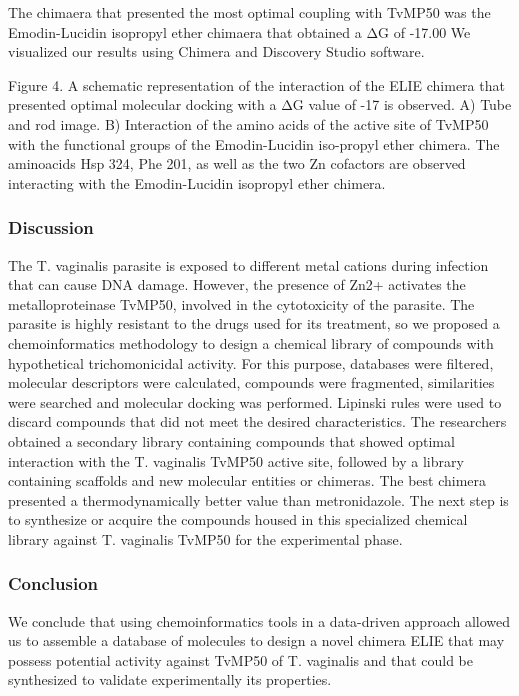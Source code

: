 \documentclass[
]{article}
\begin{document}
The chimaera that presented the most optimal coupling with TvMP50 was
the Emodin-Lucidin isopropyl ether chimaera that obtained a ΔG of -17.00
We visualized our results using Chimera and Discovery Studio software.

Figure 4. A schematic representation of the interaction of the ELIE
chimera that presented optimal molecular docking with a ΔG value of -17
is observed. A) Tube and rod image. B) Interaction of the amino acids of
the active site of TvMP50 with the functional groups of the
Emodin-Lucidin iso-propyl ether chimera. The aminoacids Hsp 324, Phe
201, as well as the two Zn cofactors are observed interacting with the
Emodin-Lucidin isopropyl ether chimera.

\hypertarget{discussion}{%
\subsubsection{Discussion}\label{discussion}}

The T. vaginalis parasite is exposed to different metal cations during
infection that can cause DNA damage. However, the presence of Zn2+
activates the metalloproteinase TvMP50, involved in the cytotoxicity of
the parasite. The parasite is highly resistant to the drugs used for its
treatment, so we proposed a chemoinformatics methodology to design a
chemical library of compounds with hypothetical trichomonicidal
activity. For this purpose, databases were filtered, molecular
descriptors were calculated, compounds were fragmented, similarities
were searched and molecular docking was performed. Lipinski rules were
used to discard compounds that did not meet the desired characteristics.
The researchers obtained a secondary library containing compounds that
showed optimal interaction with the T. vaginalis TvMP50 active site,
followed by a library containing scaffolds and new molecular entities or
chimeras. The best chimera presented a thermodynamically better value
than metronidazole. The next step is to synthesize or acquire the
compounds housed in this specialized chemical library against T.
vaginalis TvMP50 for the experimental phase.

\hypertarget{conclusion}{%
\subsubsection{Conclusion}\label{conclusion}}

We conclude that using chemoinformatics tools in a data-driven approach
allowed us to assemble a database of molecules to design a novel chimera
ELIE that may possess potential activity against TvMP50 of T. vaginalis
and that could be synthesized to validate experimentally its properties.
\end{document}
